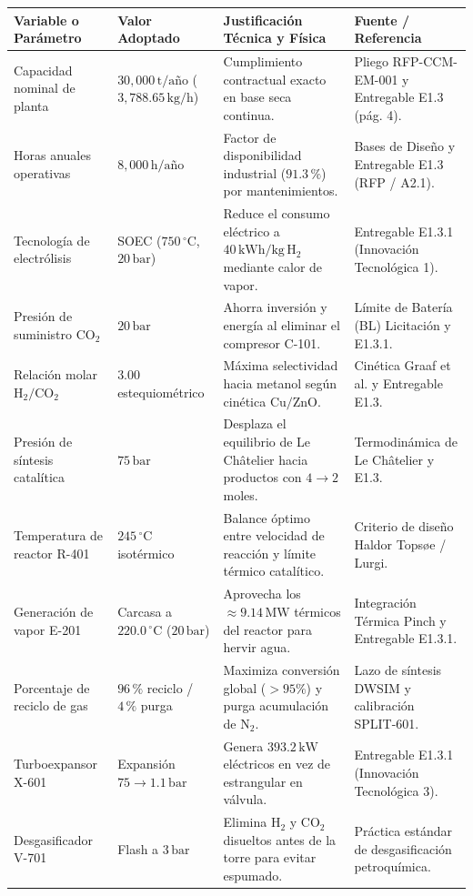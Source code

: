 \documentclass[11pt,a4paper]{article}
\begin{document}
\begin{longtable}{p{3.8cm} p{3.2cm} p{4.2cm} p{3.8cm}}
\toprule
\textbf{Variable o Parámetro} & \textbf{Valor Adoptado} & \textbf{Justificación Técnica y Física} & \textbf{Fuente / Referencia} \\
\midrule
\endhead
Capacidad nominal de planta & $30{,}000\,\text{t/año}$ ($3{,}788.65\,\text{kg/h}$) & Cumplimiento contractual exacto en base seca continua. & Pliego RFP-CCM-EM-001 y Entregable E1.3 (pág. 4). \\
Horas anuales operativas & $8{,}000\,\text{h/año}$ & Factor de disponibilidad industrial ($91.3\,\%$) por mantenimientos. & Bases de Diseño y Entregable E1.3 (RFP / A2.1). \\
Tecnología de electrólisis & SOEC ($750\,^\circ\text{C}$, $20\,\text{bar}$) & Reduce el consumo eléctrico a $40\,\text{kWh/kg}\,\text{H}_2$ mediante calor de vapor. & Entregable E1.3.1 (Innovación Tecnológica 1). \\
Presión de suministro $\text{CO}_2$ & $20\,\text{bar}$ & Ahorra inversión y energía al eliminar el compresor C-101. & Límite de Batería (BL) Licitación y E1.3.1. \\
Relación molar $\text{H}_2/\text{CO}_2$ & $3.00$ estequiométrico & Máxima selectividad hacia metanol según cinética $\text{Cu/ZnO}$. & Cinética Graaf et al. y Entregable E1.3. \\
Presión de síntesis catalítica & $75\,\text{bar}$ & Desplaza el equilibrio de Le Châtelier hacia productos con $4 \to 2$ moles. & Termodinámica de Le Châtelier y E1.3. \\
Temperatura de reactor R-401 & $245\,^\circ\text{C}$ isotérmico & Balance óptimo entre velocidad de reacción y límite térmico catalítico. & Criterio de diseño Haldor Topsøe / Lurgi. \\
Generación de vapor E-201 & Carcasa a $220.0\,^\circ\text{C}$ ($20\,\text{bar}$) & Aprovecha los $\approx 9.14\,\text{MW}$ térmicos del reactor para hervir agua. & Integración Térmica Pinch y Entregable E1.3.1. \\
Porcentaje de reciclo de gas & $96\,\%$ reciclo / $4\,\%$ purga & Maximiza conversión global ($>95\%$) y purga acumulación de $\text{N}_2$. & Lazo de síntesis DWSIM y calibración SPLIT-601. \\
Turboexpansor X-601 & Expansión $75 \to 1.1\,\text{bar}$ & Genera $393.2\,\text{kW}$ eléctricos en vez de estrangular en válvula. & Entregable E1.3.1 (Innovación Tecnológica 3). \\
Desgasificador V-701 & Flash a $3\,\text{bar}$ & Elimina $\text{H}_2$ y $\text{CO}_2$ disueltos antes de la torre para evitar espumado. & Práctica estándar de desgasificación petroquímica. \\

\end{longtable}
\end{document}
